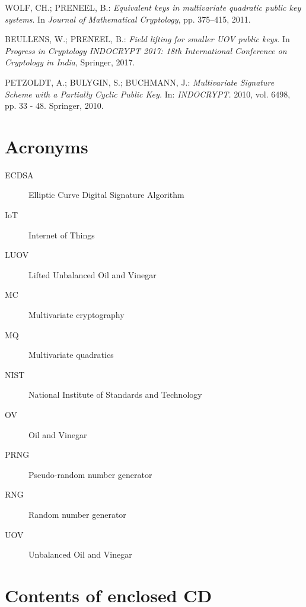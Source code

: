 \documentclass[thesis=M,english]{FITthesis}[2019/12/23]
\begin{document}
\begin{thebibliography}{9}
WOLF, CH.; PRENEEL, B.: \textit{Equivalent keys in multivariate quadratic public key systems}. In \textit{Journal of Mathematical Cryptology}, pp. 375–415, 2011.

BEULLENS, W.; PRENEEL, B.: \textit{Field lifting for smaller UOV public keys}. In \textit{Progress
in Cryptology INDOCRYPT 2017: 18th International Conference on Cryptology in India}, Springer, 2017.

PETZOLDT, A.; BULYGIN, S.; BUCHMANN, J.: \textit{Multivariate
Signature Scheme with a Partially Cyclic Public Key.} In: \textit{INDOCRYPT.} 2010, vol. 6498, pp. 33 - 48. Springer, 2010.

\end{thebibliography}
\appendix

\chapter{Acronyms}
\begin{description}
	\item[ECDSA] Elliptic Curve Digital Signature Algorithm
	\item[IoT] Internet of Things
	\item[LUOV] Lifted Unbalanced Oil and Vinegar
	\item[MC] Multivariate cryptography
	\item[MQ] Multivariate quadratics
	\item[NIST] National Institute of Standards and Technology
	\item[OV] Oil and Vinegar
	\item[PRNG] Pseudo-random number generator
	\item[RNG] Random number generator
	\item[UOV] Unbalanced Oil and Vinegar	
\end{description}


\chapter{Contents of enclosed CD}


\begin{figure}
\end{figure}
\end{document}
